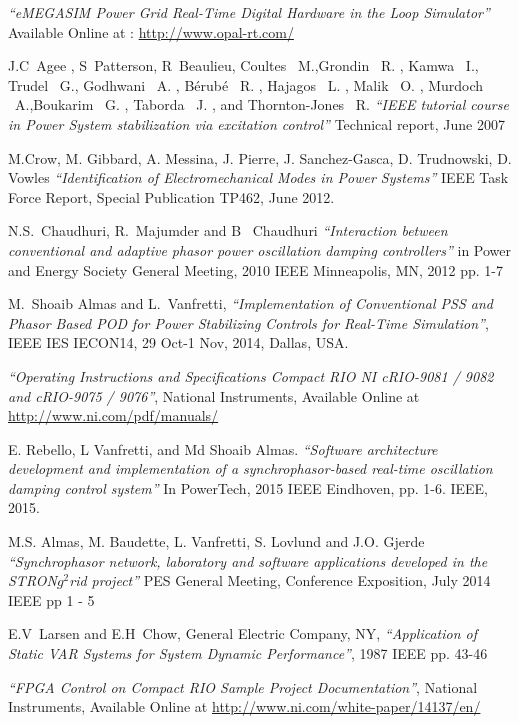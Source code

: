 \documentclass{ieeeaccess}
\begin{document}
\begin{thebibliography}{00}
 \emph{``eMEGASIM Power Grid Real-Time Digital Hardware in the Loop Simulator''} Available Online at : \underline{http://www.opal-rt.com/}

 J.C~Agee , S~Patterson, R~Beaulieu, Coultes \ M.,Grondin \ R. , Kamwa \ I.,
Trudel \ G., Godhwani \ A. , Bérubé \ R. , Hajagos \ L. , Malik \ O. , Murdoch \ A.,Boukarim \ G. , Taborda \ J. , and Thornton-Jones \ R. \emph{``IEEE tutorial course in Power System stabilization via excitation control''} Technical report, June 2007


 M.Crow, M. Gibbard, A. Messina, J. Pierre, J. Sanchez-Gasca, D. Trudnowski, D. Vowles \emph{``Identification of Electromechanical Modes in Power Systems''} IEEE Task Force Report, Special Publication TP462, June 2012.

 N.S.~Chaudhuri, R.~Majumder and B~ Chaudhuri \emph{``Interaction between conventional and adaptive phasor power oscillation damping controllers''} in Power and Energy Society General Meeting, 2010 IEEE Minneapolis, MN, 2012 pp. 1-7
  
 M.~Shoaib Almas and L.~Vanfretti, \emph{``Implementation of Conventional PSS and Phasor Based POD for Power Stabilizing Controls for Real-Time Simulation''}, IEEE IES IECON14, 29 Oct-1 Nov, 2014, Dallas, USA.

 \emph{``Operating Instructions and Specifications Compact RIO NI cRIO-9081 / 9082 and cRIO-9075 / 9076''}, National Instruments, Available Online at \underline{http://www.ni.com/pdf/manuals/}

E. Rebello, L Vanfretti, and Md Shoaib Almas. \emph{``Software architecture development and implementation of a synchrophasor-based real-time oscillation damping control system''} In PowerTech, 2015 IEEE Eindhoven, pp. 1-6. IEEE, 2015.

 M.S. Almas, M. Baudette, L. Vanfretti, S. Lovlund and J.O. Gjerde \emph{``Synchrophasor network, laboratory and software applications developed in the STRON$g^{2}$rid project''} PES General Meeting, Conference Exposition, July 2014 IEEE pp 1 - 5

 E.V~Larsen and E.H~Chow, General Electric Company, NY, \emph{``Application of Static VAR Systems for System Dynamic Performance''}, 1987 IEEE pp. 43-46

 \emph{``FPGA Control on Compact RIO Sample Project Documentation''}, National Instruments, Available Online at \underline{http://www.ni.com/white-paper/14137/en/}



\end{thebibliography}
\end{document}
